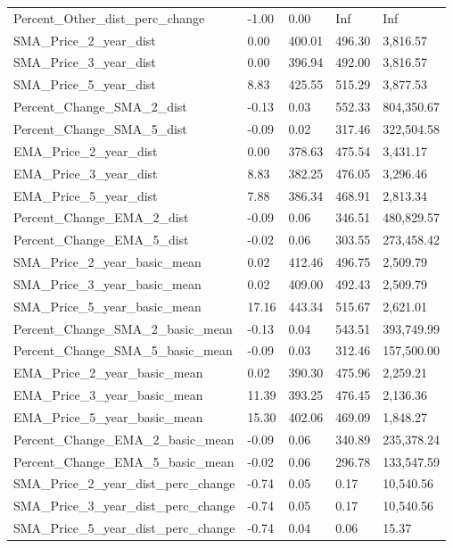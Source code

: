 \documentclass[12pt,]{article}
\begin{document}
\begin{table}
{\begin{tabular}[t]{lllll}
Percent\_Other\_dist\_perc\_change & -1.00 & 0.00 & Inf & Inf\\
SMA\_Price\_2\_year\_dist & 0.00 & 400.01 & 496.30 & 3,816.57\\
\addlinespace
SMA\_Price\_3\_year\_dist & 0.00 & 396.94 & 492.00 & 3,816.57\\
SMA\_Price\_5\_year\_dist & 8.83 & 425.55 & 515.29 & 3,877.53\\
Percent\_Change\_SMA\_2\_dist & -0.13 & 0.03 & 552.33 & 804,350.67\\
Percent\_Change\_SMA\_5\_dist & -0.09 & 0.02 & 317.46 & 322,504.58\\
EMA\_Price\_2\_year\_dist & 0.00 & 378.63 & 475.54 & 3,431.17\\
\addlinespace
EMA\_Price\_3\_year\_dist & 8.83 & 382.25 & 476.05 & 3,296.46\\
EMA\_Price\_5\_year\_dist & 7.88 & 386.34 & 468.91 & 2,813.34\\
Percent\_Change\_EMA\_2\_dist & -0.09 & 0.06 & 346.51 & 480,829.57\\
Percent\_Change\_EMA\_5\_dist & -0.02 & 0.06 & 303.55 & 273,458.42\\
SMA\_Price\_2\_year\_basic\_mean & 0.02 & 412.46 & 496.75 & 2,509.79\\
\addlinespace
SMA\_Price\_3\_year\_basic\_mean & 0.02 & 409.00 & 492.43 & 2,509.79\\
SMA\_Price\_5\_year\_basic\_mean & 17.16 & 443.34 & 515.67 & 2,621.01\\
Percent\_Change\_SMA\_2\_basic\_mean & -0.13 & 0.04 & 543.51 & 393,749.99\\
Percent\_Change\_SMA\_5\_basic\_mean & -0.09 & 0.03 & 312.46 & 157,500.00\\
EMA\_Price\_2\_year\_basic\_mean & 0.02 & 390.30 & 475.96 & 2,259.21\\
\addlinespace
EMA\_Price\_3\_year\_basic\_mean & 11.39 & 393.25 & 476.45 & 2,136.36\\
EMA\_Price\_5\_year\_basic\_mean & 15.30 & 402.06 & 469.09 & 1,848.27\\
Percent\_Change\_EMA\_2\_basic\_mean & -0.09 & 0.06 & 340.89 & 235,378.24\\
Percent\_Change\_EMA\_5\_basic\_mean & -0.02 & 0.06 & 296.78 & 133,547.59\\
SMA\_Price\_2\_year\_dist\_perc\_change & -0.74 & 0.05 & 0.17 & 10,540.56\\
\addlinespace
SMA\_Price\_3\_year\_dist\_perc\_change & -0.74 & 0.05 & 0.17 & 10,540.56\\
SMA\_Price\_5\_year\_dist\_perc\_change & -0.74 & 0.04 & 0.06 & 15.37\\

\end{tabular}}
\end{table}
\end{document}
